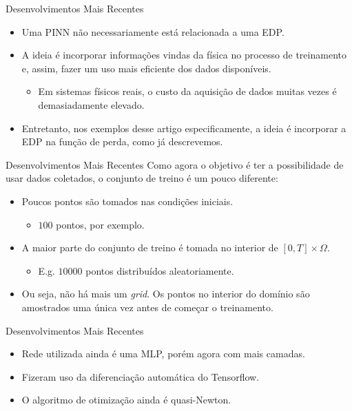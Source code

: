 \documentclass[13pt]{beamer}
\begin{document}
\begin{frame}{Desenvolvimentos Mais Recentes}
    \begin{itemize}
        \item<1-> Uma PINN não necessariamente está relacionada a uma EDP.
        \item<2-> A ideia é incorporar informações vindas da física no processo de treinamento e, assim, fazer um uso mais eficiente dos dados disponíveis.
            \begin{itemize}
                \item Em sistemas físicos reais, o custo da aquisição de dados muitas vezes é demasiadamente elevado.
            \end{itemize}
        \item<3-> Entretanto, nos exemplos desse artigo especificamente, a ideia é incorporar a EDP na função de perda, como já descrevemos.
    \end{itemize}
\end{frame}

\begin{frame}{Desenvolvimentos Mais Recentes}
    Como agora o objetivo é ter a possibilidade de usar dados coletados, o conjunto de treino é um pouco diferente:
    \begin{itemize}
        \item<2-> Poucos pontos são tomados nas condições iniciais.
            \begin{itemize}
                \item \( 100 \) pontos, por exemplo.
            \end{itemize}
        \item<3-> A maior parte do conjunto de treino é tomada no interior de \( [0, T] \times \Omega \).
            \begin{itemize}
                \item E.g. \( 10 000 \) pontos distribuídos aleatoriamente.
            \end{itemize}
        \item<4-> Ou seja, não há mais um \emph{grid}.
            Os pontos no interior do domínio são amostrados uma única vez antes de começar o treinamento.
    \end{itemize}
\end{frame}

\begin{frame}{Desenvolvimentos Mais Recentes}
    \begin{itemize}
        \item<1-> Rede utilizada ainda é uma MLP, porém agora com mais camadas.
        \item<2-> Fizeram uso da diferenciação automática do Tensorflow.
        \item<3-> O algoritmo de otimização ainda é quasi-Newton.
    \end{itemize}
\end{frame}
\end{document}
